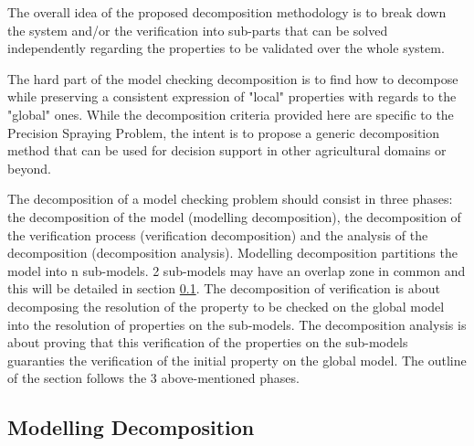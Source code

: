 
The overall idea of the proposed decomposition methodology is to break down the system and/or the verification into sub-parts that can be solved independently regarding the properties to be validated over the whole system.

The hard part of the model checking decomposition is to find how to decompose while preserving a consistent expression of "local" properties with regards to the "global" ones. While the decomposition criteria provided here are specific to the Precision Spraying Problem, the intent is to propose a generic decomposition method that can be used for decision support in other agricultural domains or beyond.

The decomposition of a model checking problem should consist in three phases: the decomposition of the model (modelling decomposition), the decomposition of the verification process (verification decomposition) and the analysis of the decomposition (decomposition analysis). Modelling decomposition partitions the model into n sub-models. 2 sub-models may have an overlap zone in common and this will be detailed in section \ref{MD}.
The decomposition of verification is about decomposing the resolution of the property to be checked on the global model into the resolution of properties on the sub-models. The decomposition analysis is about proving that this verification of the properties on the sub-models guaranties the verification of the initial property on the global model.
The outline of the section follows the 3 above-mentioned phases.



\subsection{Modelling Decomposition}
\label{MD}

